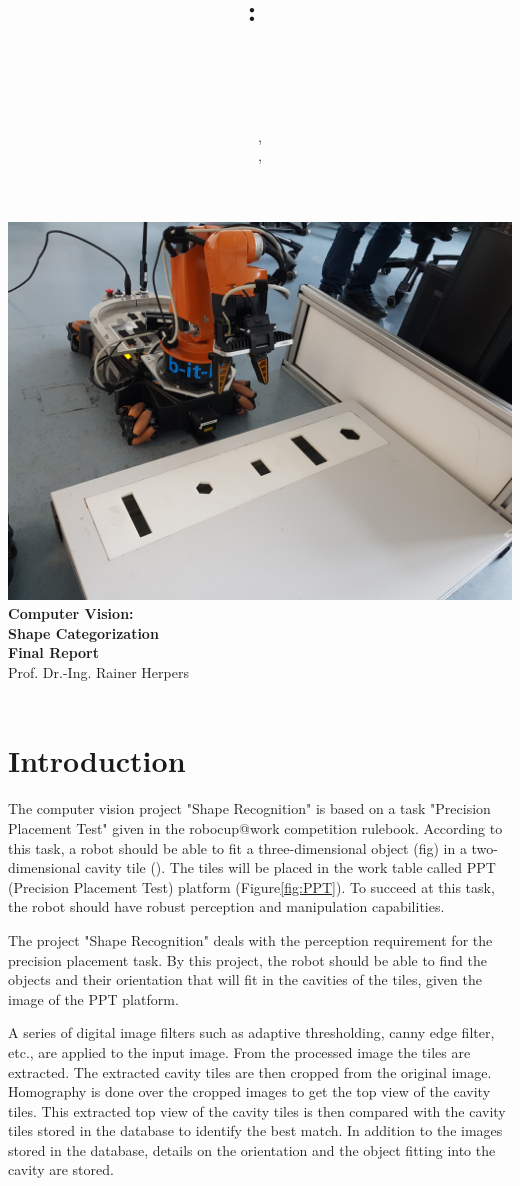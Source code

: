 \documentclass{article}
\title{
\vspace{2in}
\textmd{\textbf{\hmwkClass:\ \\ \hmwkTitle}}\\
\vspace{0.1in}\large{\hmwkClassInstructor\ }
\vspace{3in}
}
\author{\textbf{\hmwkAuthorName}, \hmwkfirstmat\\ \textbf{\hmwksecondauthor}, \hmwksecondmat}
\date{} %
\newcommand{\hmwkTitle}{Shape Categorization\\Final Report} %
\newcommand{\hmwkClass}{Computer Vision} %
\newcommand{\hmwkClassInstructor}{Prof. Dr.-Ing. Rainer Herpers} %
\newcommand{\hmwkimage}{\centering\includegraphics[draft=false, scale = 0.075]{images/FrontPicture.jpg}}
\begin{document}
\begin{titlepage}
\hmwkimage\\
\vspace{1in}
\textmd{\Huge\textbf{\hmwkClass:\ \\ \hmwkTitle}}\\
\vspace{0.1in}\large{\hmwkClassInstructor\ }
\vspace{3in}\\
\theauthor\
\thispagestyle{empty}
\end{titlepage}


\setcounter{page}{1}

\tableofcontents

\newpage


\section{Introduction}

 The computer vision project "Shape Recognition" is based on a task "Precision Placement Test" given in the robocup@work competition rulebook. According to this task, a robot should be able to fit a three-dimensional object (fig) in a two-dimensional cavity tile (). The tiles will be placed in the work table called PPT (Precision Placement Test) platform (Figure\ref{fig:PPT}). To succeed at this task, the robot should have robust perception and manipulation capabilities.
 
	The project "Shape Recognition" deals with the perception requirement for the precision placement task.
By this project, the robot should be able to find the objects and their orientation that will fit in the cavities of the tiles, given the image of the PPT platform.

	A series of digital image filters such as adaptive thresholding, canny edge filter, etc.,  are applied to the input image. From the processed image the tiles are extracted. The extracted cavity tiles are then cropped from the original image. Homography is done over the cropped images to get the top view of the cavity tiles. This extracted top view of the cavity tiles is then compared with the cavity tiles stored in the database to identify the best match. In addition to the images stored in the database, details on the orientation and the object fitting into the cavity are stored.
\end{document}
